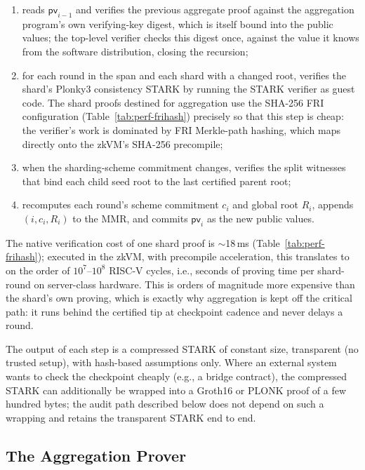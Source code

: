 \documentclass[11pt]{article}
\begin{document}
\begin{enumerate}[nosep]
  \item reads $\mathsf{pv}_{i-1}$ and verifies the previous aggregate proof against the aggregation program's own verifying-key digest, which is itself bound into the public values; the top-level verifier checks this digest once, against the value it knows from the software distribution, closing the recursion;
  \item for each round in the span and each shard with a changed root, verifies the shard's Plonky3 consistency STARK by running the STARK verifier as guest code. The shard proofs destined for aggregation use the SHA-256 FRI configuration (Table~\ref{tab:perf-frihash}) precisely so that this step is cheap: the verifier's work is dominated by FRI Merkle-path hashing, which maps directly onto the zkVM's SHA-256 precompile;
  \item when the sharding-scheme commitment changes, verifies the split witnesses that bind each child seed root to the last certified parent root;
  \item recomputes each round's scheme commitment $c_i$ and global root $R_i$, appends $(i,c_i,R_i)$ to the MMR, and commits $\mathsf{pv}_i$ as the new public values.
\end{enumerate}

The native verification cost of one shard proof is $\sim$18\,ms (Table~\ref{tab:perf-frihash}); executed in the zkVM, with precompile acceleration, this translates to on the order of $10^7$--$10^8$ RISC-V cycles, i.e., seconds of proving time per shard-round on server-class hardware. This is orders of magnitude more expensive than the shard's own proving, which is exactly why aggregation is kept off the critical path: it runs behind the certified tip at checkpoint cadence and never delays a round.

The output of each step is a compressed STARK of constant size, transparent (no trusted setup), with hash-based assumptions only. Where an external system wants to check the checkpoint cheaply (e.g., a bridge contract), the compressed STARK can additionally be wrapped into a Groth16 or PLONK proof of a few hundred bytes; the audit path described below does not depend on such a wrapping and retains the transparent STARK end to end.

\subsection{The Aggregation Prover}
\label{sec:aggregation-prover}
\end{document}
